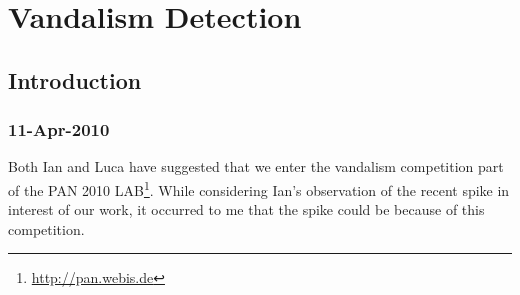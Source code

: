 \chapter{Vandalism Detection}

\section{Introduction}

\subsection{11-Apr-2010}

Both Ian and Luca have suggested that we enter the vandalism competition
part of the PAN 2010 LAB\footnote{\url{http://pan.webis.de}}.
While considering Ian's observation of the recent spike in
interest of our work, it occurred to me that the spike could
be because of this competition.

